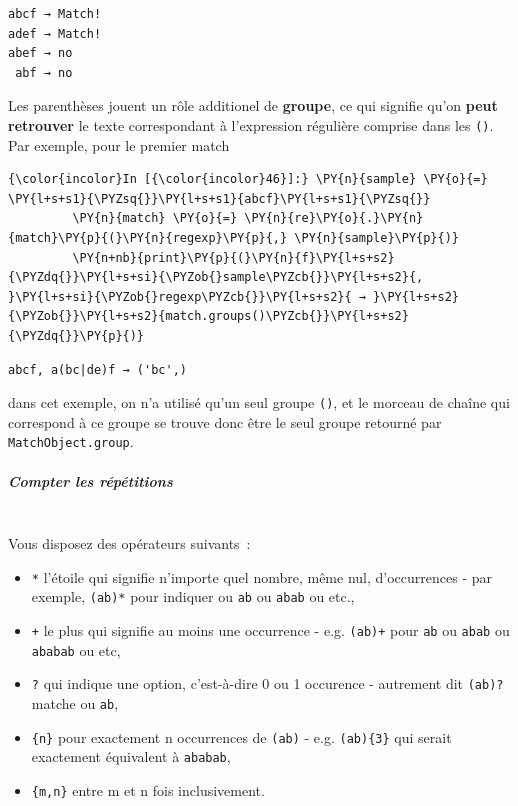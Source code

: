     \begin{Verbatim}[commandchars=\\\{\}]
abcf → Match!
adef → Match!
abef → no
 abf → no

    \end{Verbatim}

    Les parenthèses jouent un rôle additionel de \textbf{groupe}, ce qui
signifie qu'on \textbf{peut retrouver} le texte correspondant à
l'expression régulière comprise dans les \texttt{()}. Par exemple, pour
le premier match

    \begin{Verbatim}[commandchars=\\\{\}]
{\color{incolor}In [{\color{incolor}46}]:} \PY{n}{sample} \PY{o}{=} \PY{l+s+s1}{\PYZsq{}}\PY{l+s+s1}{abcf}\PY{l+s+s1}{\PYZsq{}}
         \PY{n}{match} \PY{o}{=} \PY{n}{re}\PY{o}{.}\PY{n}{match}\PY{p}{(}\PY{n}{regexp}\PY{p}{,} \PY{n}{sample}\PY{p}{)}
         \PY{n+nb}{print}\PY{p}{(}\PY{n}{f}\PY{l+s+s2}{\PYZdq{}}\PY{l+s+si}{\PYZob{}sample\PYZcb{}}\PY{l+s+s2}{, }\PY{l+s+si}{\PYZob{}regexp\PYZcb{}}\PY{l+s+s2}{ → }\PY{l+s+s2}{\PYZob{}}\PY{l+s+s2}{match.groups()\PYZcb{}}\PY{l+s+s2}{\PYZdq{}}\PY{p}{)}
\end{Verbatim}


    \begin{Verbatim}[commandchars=\\\{\}]
abcf, a(bc|de)f → ('bc',)

    \end{Verbatim}

    dans cet exemple, on n'a utilisé qu'un seul groupe \texttt{()}, et le
morceau de chaîne qui correspond à ce groupe se trouve donc être le seul
groupe retourné par \texttt{MatchObject.group}.

    \hypertarget{compter-les-ruxe9puxe9titions}{%
\subparagraph{Compter les
répétitions\\\\}\label{compter-les-ruxe9puxe9titions}}

    Vous disposez des opérateurs suivants~:
    
\begin{itemize}
	\item 
   	\texttt{*} l'étoile qui
	signifie n'importe quel nombre, même nul, d'occurrences - par exemple,
	\texttt{(ab)*} pour indiquer
	\texttt{\textquotesingle{}\textquotesingle{}} ou
	\texttt{\textquotesingle{}ab\textquotesingle{}} ou
	\texttt{\textquotesingle{}abab\textquotesingle{}} ou etc.,
	\item
	\texttt{+}
	le plus qui signifie au moins une occurrence - e.g. \texttt{(ab)+} pour
	\texttt{ab} ou \texttt{abab} ou \texttt{ababab} ou etc,
	\item
	\texttt{?} qui
	indique une option, c'est-à-dire 0 ou 1 occurence - autrement dit
	\texttt{(ab)?} matche \texttt{\textquotesingle{}\textquotesingle{}} ou
	\texttt{ab},
	\item
	\texttt{\{n\}} pour exactement n occurrences de
	\texttt{(ab)} - e.g. \texttt{(ab)\{3\}} qui serait exactement équivalent
	à \texttt{ababab},
	\item
	\texttt{\{m,n\}} entre m et n fois inclusivement.
\end{itemize}

